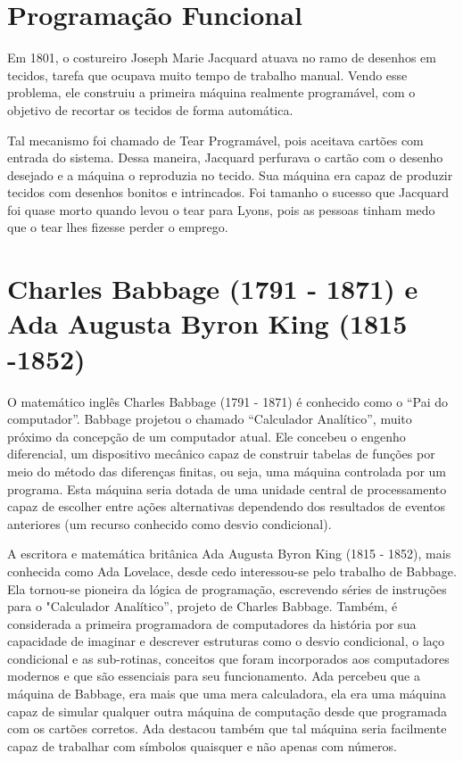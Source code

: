 \documentclass[
	12pt,				%
	openright,			%
	twoside,			%
	a4paper,			%
	english,			%
	french,				%
	spanish,			%
	brazil,				%
	]{abntex2}
\begin{document}
\chapter{Programação Funcional}

Em 1801, o costureiro Joseph Marie Jacquard atuava no ramo de desenhos em tecidos, tarefa que ocupava muito tempo de trabalho manual. Vendo esse problema, ele construiu a primeira máquina realmente programável, com o objetivo de recortar os tecidos de forma automática.
\par
Tal mecanismo foi chamado de Tear Programável, pois aceitava cartões com entrada do sistema. Dessa maneira, Jacquard perfurava o cartão com o desenho desejado e a máquina o reproduzia no tecido. Sua máquina era capaz de produzir tecidos com desenhos bonitos e intrincados. Foi tamanho o sucesso que Jacquard foi quase morto quando levou o tear para Lyons, pois as pessoas tinham medo que o tear lhes fizesse perder o emprego.


\chapter{Charles Babbage (1791 - 1871) e Ada Augusta Byron King (1815 -1852)}

O matemático inglês Charles Babbage (1791 - 1871) é conhecido como o “Pai do computador”. Babbage projetou o chamado “Calculador Analítico”, muito próximo da concepção de um computador atual. Ele concebeu o engenho diferencial, um dispositivo mecânico capaz de construir tabelas de funções por meio do método das diferenças finitas, ou seja, uma máquina controlada por um programa. Esta máquina seria dotada de uma unidade central de processamento capaz de escolher entre ações alternativas dependendo dos resultados de eventos anteriores (um recurso conhecido como desvio condicional).
\par
A escritora e matemática britânica Ada Augusta Byron King (1815 - 1852), mais conhecida como Ada Lovelace, desde cedo interessou-se pelo trabalho de Babbage. Ela tornou-se pioneira da lógica de programação, escrevendo séries de instruções para o "Calculador Analítico”, projeto de Charles Babbage. Também, é considerada a primeira programadora de computadores da história por sua capacidade de imaginar e descrever estruturas como o desvio condicional, o laço condicional e as sub-rotinas, conceitos que foram incorporados aos computadores modernos e que são essenciais para seu funcionamento.
Ada percebeu que a máquina de Babbage, era mais que uma mera calculadora, ela era uma máquina capaz de simular qualquer outra máquina de computação desde que programada com os cartões corretos. Ada destacou também que tal máquina seria facilmente capaz de trabalhar com símbolos quaisquer e não apenas com números.
\end{document}
